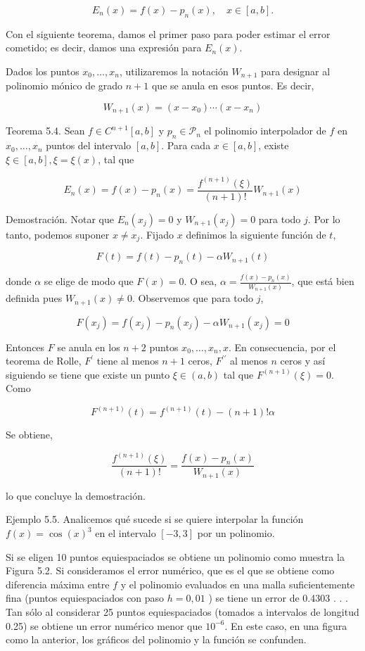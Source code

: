 \documentclass[10pt]{article}
\begin{document}
$$
E_{n}(x)=f(x)-p_{n}(x), \quad x \in[a, b] .
$$

Con el siguiente teorema, damos el primer paso para poder estimar el error cometido; es decir, damos una expresión para $E_{n}(x)$.

Dados los puntos $x_{0}, \ldots, x_{n}$, utilizaremos la notación $W_{n+1}$ para designar al polinomio mónico de grado $n+1$ que se anula en esos puntos. Es decir,

$$
W_{n+1}(x)=\left(x-x_{0}\right) \cdots\left(x-x_{n}\right)
$$

Teorema 5.4. Sean $f \in C^{n+1}[a, b]$ y $p_{n} \in \mathcal{P}_{n}$ el polinomio interpolador de $f$ en $x_{0}, \ldots, x_{n}$ puntos del intervalo $[a, b]$. Para cada $x \in[a, b]$, existe $\xi \in[a, b], \xi=\xi(x)$, tal que

$$
E_{n}(x)=f(x)-p_{n}(x)=\frac{f^{(n+1)}(\xi)}{(n+1)!} W_{n+1}(x)
$$

Demostración. Notar que $E_{n}\left(x_{j}\right)=0$ y $W_{n+1}\left(x_{j}\right)=0$ para todo $j$. Por lo tanto, podemos suponer $x \neq x_{j}$. Fijado $x$ definimos la siguiente función de $t$,

$$
F(t)=f(t)-p_{n}(t)-\alpha W_{n+1}(t)
$$

donde $\alpha$ se elige de modo que $F(x)=0$. O sea, $\alpha=\frac{f(x)-p_{n}(x)}{W_{n+1}(x)}$, que está bien definida pues $W_{n+1}(x) \neq 0$. Observemos que para todo $j$,

$$
F\left(x_{j}\right)=f\left(x_{j}\right)-p_{n}\left(x_{j}\right)-\alpha W_{n+1}\left(x_{j}\right)=0
$$

Entonces $F$ se anula en los $n+2$ puntos $x_{0}, \ldots, x_{n}, x$. En consecuencia, por el teorema de Rolle, $F^{\prime}$ tiene al menos $n+1$ ceros, $F^{\prime \prime}$ al menos $n$ ceros y así siguiendo se tiene que existe un punto $\xi \in(a, b)$ tal que $F^{(n+1)}(\xi)=0$. Como

$$
F^{(n+1)}(t)=f^{(n+1)}(t)-(n+1)!\alpha
$$

Se obtiene,

$$
\frac{f^{(n+1)}(\xi)}{(n+1)!}=\frac{f(x)-p_{n}(x)}{W_{n+1}(x)}
$$

lo que concluye la demostración.

Ejemplo 5.5. Analicemos qué sucede si se quiere interpolar la función $f(x)=\cos (x)^{3}$ en el intervalo $[-3,3]$ por un polinomio.

Si se eligen 10 puntos equiespaciados se obtiene un polinomio como muestra la Figura 5.2. Si consideramos el error numérico, que es el que se obtiene como diferencia máxima entre $f$ y el polinomio evaluados en una malla suficientemente fina (puntos equiespaciados con paso $h=0,01$ ) se tiene un error de 0.4303 . . . Tan sólo al considerar 25 puntos equiespaciados (tomados a intervalos de longitud 0.25) se obtiene un error numérico menor que $10^{-6}$. En este caso, en una figura como la anterior, los gráficos del polinomio y la función se confunden.
\end{document}
